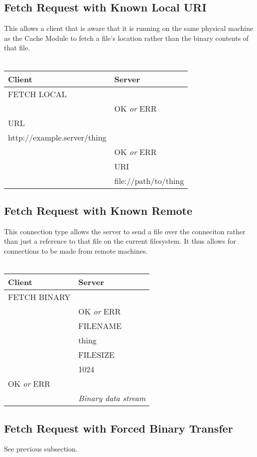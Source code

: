 \documentclass[letterpaper]{article}
\begin{document}
\subsection{Fetch Request with Known Local URI}
This allows a client that is aware that it is running on the same physical machine as the Cache Module to fetch a file's location rather than the binary contents of that file.
\\
\\
\begin{tabular}{|l|l|}
\hline
\textbf{Client} & \textbf{Server}\\
\hline
\hline
FETCH LOCAL &\\
\hline
& OK \textit{or} ERR\\
\hline
URL & \\
http://example.server/thing & \\
\hline
& OK \textit{or} ERR\\
& URI\\
& file://path/to/thing\\
\hline
\end{tabular}

\subsection{Fetch Request with Known Remote}
This connection type allows the server to send a file over the conneciton rather than just a reference to that file on the current filesystem. It thus allows for connections to be made from remote machines. 
\\
\\
\begin{tabular}{|l|l|}
\hline
\textbf{Client} & \textbf{Server}\\
\hline
\hline
FETCH BINARY &\\
\hline
& OK \textit{or} ERR\\
\hline
& FILENAME \\
& thing \\
\hline
& FILESIZE \\
& 1024 \\
\hline
OK \textit{or} ERR & \\
\hline
& \textit{Binary data stream}\\
\hline
\end{tabular}

\subsection{Fetch Request with Forced Binary Transfer}
See previous subsection.
\end{document}
